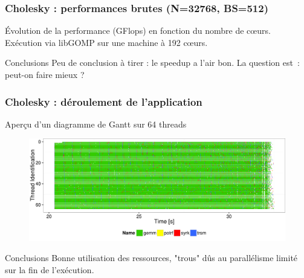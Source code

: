 \documentclass[xcolor={usenames,dvipsnames,svgnames,table}, aspectratio=43]{beamer}
\begin{document}
\begin{frame}
  \frametitle{Cholesky : performances brutes (N=32768, BS=512)}

  Évolution de la performance (GFlops) en fonction du nombre de cœurs.\\
  Exécution via libGOMP sur une machine à 192 cœurs.

  \begin{figure}
  \end{figure}
  \begin{block}{Conclusions}
    Peu de conclusion à tirer : le speedup a l'air bon. La question est~: peut-on faire mieux ?
  \end{block}
\end{frame}

\begin{frame}
\frametitle{Cholesky : déroulement de l'application}

Aperçu d'un diagramme de Gantt sur 64 threads
\begin{figure}
  \includegraphics[width=\textwidth]{graph/gantt_32768_512.pdf}
\end{figure}
 {
  \begin{block}{Conclusions}
    Bonne utilisation des ressources, "trous" dûs au parallélisme limité sur la fin de l'exécution.
  \end{block}
}

\end{frame}
\end{document}
